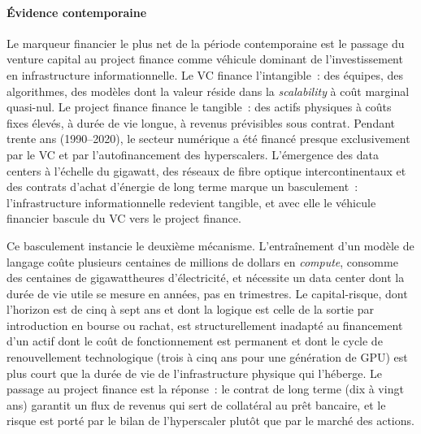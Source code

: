 \paragraph{Évidence contemporaine}


Le marqueur financier le plus net de la période contemporaine est le passage du venture capital au project finance comme véhicule dominant de l'investissement en infrastructure informationnelle. Le VC finance l'intangible~: des équipes, des algorithmes, des modèles dont la valeur réside dans la \emph{scalability} à coût marginal quasi-nul. Le project finance finance le tangible~: des actifs physiques à coûts fixes élevés, à durée de vie longue, à revenus prévisibles sous contrat. Pendant trente ans (1990--2020), le secteur numérique a été financé presque exclusivement par le VC et par l'autofinancement des hyperscalers. L'émergence des data centers à l'échelle du gigawatt, des réseaux de fibre optique intercontinentaux et des contrats d'achat d'énergie de long terme marque un basculement~: l'infrastructure informationnelle redevient tangible, et avec elle le véhicule financier bascule du VC vers le project finance.

Ce basculement instancie le deuxième mécanisme. L'entraînement d'un modèle de langage coûte plusieurs centaines de millions de dollars en \emph{compute}, consomme des centaines de gigawattheures d'électricité, et nécessite un data center dont la durée de vie utile se mesure en années, pas en trimestres. Le capital-risque, dont l'horizon est de cinq à sept ans et dont la logique est celle de la sortie par introduction en bourse ou rachat, est structurellement inadapté au financement d'un actif dont le coût de fonctionnement est permanent et dont le cycle de renouvellement technologique (trois à cinq ans pour une génération de GPU) est plus court que la durée de vie de l'infrastructure physique qui l'héberge. Le passage au project finance est la réponse~: le contrat de long terme (dix à vingt ans) garantit un flux de revenus qui sert de collatéral au prêt bancaire, et le risque est porté par le bilan de l'hyperscaler plutôt que par le marché des actions.

